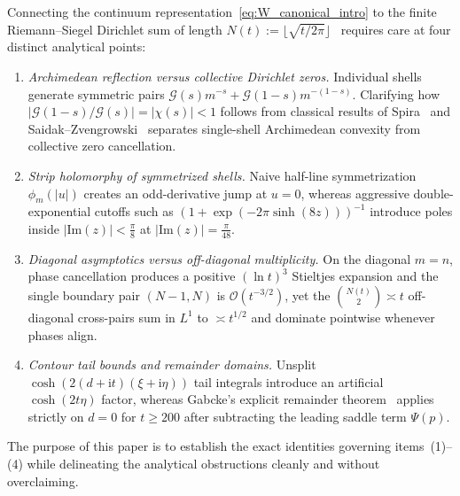 \documentclass[11pt,reqno]{amsart}
\theoremstyle{definition}
\theoremstyle{remark}
\numberwithin{equation}{section}
\newcommand{\ii}{\mathrm{i}}
\newcommand{\Ima}{\mathrm{Im}}
\begin{document}
Connecting the continuum representation~\eqref{eq:W_canonical_intro} to the finite Riemann--Siegel Dirichlet sum of length $N(t) := \lfloor\sqrt{t/2\pi}\rfloor$~\cite{siegel1932,gabcke1979} requires care at four distinct analytical points:
\begin{enumerate}[label=\textup{(\arabic*)},leftmargin=2.2em]
\item \textit{Archimedean reflection versus collective Dirichlet zeros.} Individual shells generate symmetric pairs $\mathcal{G}(s)m^{-s} + \mathcal{G}(1-s)m^{-(1-s)}$. Clarifying how $\lvert\mathcal{G}(1-s)/\mathcal{G}(s)\rvert = \lvert\chi(s)\rvert < 1$ follows from classical results of Spira~\cite{spira1965} and Saidak--Zvengrowski~\cite{saidakzvengrowski2003} separates single-shell Archimedean convexity from collective zero cancellation.
\item \textit{Strip holomorphy of symmetrized shells.} Naive half-line symmetrization $\phi_m(\lvert u\rvert)$ creates an odd-derivative jump at $u = 0$, whereas aggressive double-exponential cutoffs such as $(1 + \exp(-2\pi\sinh(8z)))^{-1}$ introduce poles inside $\lvert\Ima(z)\rvert < \frac{\pi}{8}$ at $\lvert\Ima(z)\rvert = \frac{\pi}{48}$.
\item \textit{Diagonal asymptotics versus off-diagonal multiplicity.} On the diagonal $m = n$, phase cancellation produces a positive $(\ln t)^3$ Stieltjes expansion and the single boundary pair $(N-1,N)$ is $\mathcal{O}(t^{-3/2})$, yet the $\binom{N(t)}{2} \asymp t$ off-diagonal cross-pairs sum in $L^1$ to $\asymp t^{1/2}$ and dominate pointwise whenever phases align.
\item \textit{Contour tail bounds and remainder domains.} Unsplit $\cosh(2(d+\ii t)(\xi+\ii\eta))$ tail integrals introduce an artificial $\cosh(2t\eta)$ factor, whereas Gabcke's explicit remainder theorem~\cite{gabcke1979} applies strictly on $d = 0$ for $t \ge 200$ after subtracting the leading saddle term $\Psi(p)$.
\end{enumerate}

The purpose of this paper is to establish the exact identities governing items~(1)--(4) while delineating the analytical obstructions cleanly and without overclaiming.
\end{document}
